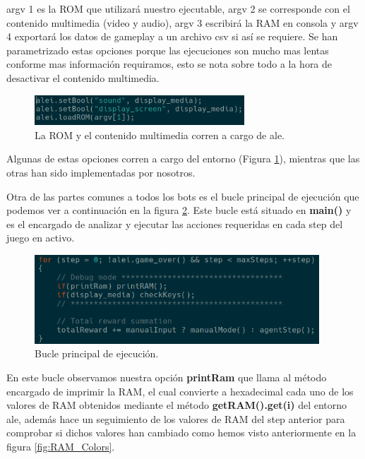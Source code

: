argv 1 es la ROM que utilizará nuestro ejecutable, argv 2 se corresponde con el contenido multimedia (video y audio), argv 3 escribirá la RAM en consola y argv 4 exportará los datos de gameplay a un archivo \ac{csv} si así se requiere. Se han parametrizado estas opciones porque las ejecuciones son mucho mas lentas conforme mas información requiramos, esto se nota sobre todo a la hora de desactivar el contenido multimedia.

\begin{figure}[h]
	\centering
	\includegraphics[width=0.7\textwidth]{Figures/ALEromANDmedia}
	\caption{La ROM y el contenido multimedia corren a cargo de \ac{ale}.}
	\label{fig:ALEromANDmedia}
\end{figure}

\newpage
Algunas de estas opciones corren a cargo del entorno (Figura 	\ref{fig:ALEromANDmedia}), mientras que las otras han sido implementadas por nosotros.

Otra de las partes comunes a todos los bots es el bucle principal de ejecución que podemos ver a continuación en la figura \ref{fig:ALEMainExecLoop}. Este bucle está situado en \textbf{main()} y es el encargado de analizar y ejecutar las acciones requeridas en cada step del juego en activo.

\begin{figure}[h]
	\centering
	\includegraphics[width=0.95\textwidth]{Figures/ALEMainExecLoop}
	\caption{Bucle principal de ejecución.}
	\label{fig:ALEMainExecLoop}
\end{figure}

En este bucle observamos nuestra opción \textbf{printRam} que llama al método encargado de imprimir la RAM, el cual convierte a hexadecimal cada uno de los valores de RAM obtenidos mediante el método \textbf{getRAM().get(i)} del entorno \ac{ale}, además hace un seguimiento de los valores de RAM del step anterior para comprobar si dichos valores han cambiado como hemos visto anteriormente en la figura \ref{fig:RAM_Colors}.

